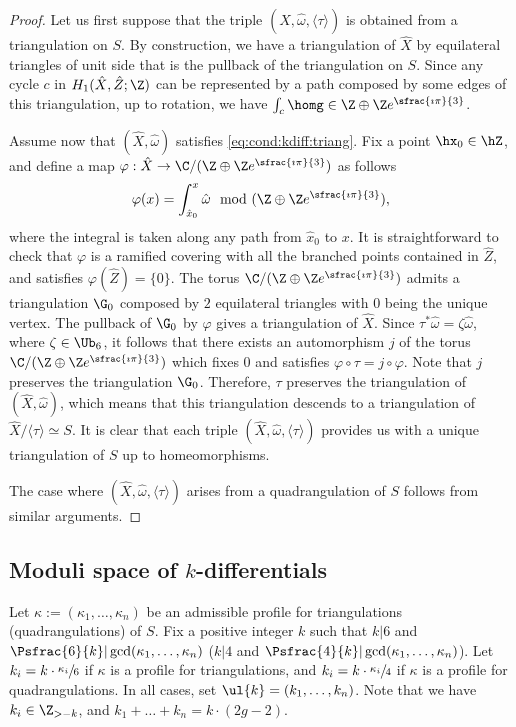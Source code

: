 \begin{proof}
Let us first suppose that the triple $(\hat{X},\hat{\omega},\langle\tau\rangle)$ is obtained from a triangulation on $S$. By construction, we have a triangulation of $\hat{X}$ by equilateral triangles of unit side that is the pullback of the triangulation on $S$. Since any cycle $c$ in $H_1(\hat{X},\hat{Z};\Z)$ can be represented by a path composed by some edges of this triangulation, up to rotation, we have $\int_c\homg \in \Z\oplus\Z e^{\sfrac{\imath\pi}{3}}$.

Assume now that $(\hat{X},\hat{\omega})$ satisfies \eqref{eq:cond:kdiff:triang}. Fix a point $\hx_0 \in \hZ$, and define a map $\varphi: \hat{X} \to \C/(\Z\oplus\Z e^{\sfrac{\imath\pi}{3}})$ as follows
\[
\varphi(x)=\int_{\hat{x}_0}^x \hat{\omega} \mod (\Z\oplus\Z e^{\sfrac{\imath\pi}{3}}),
\]
where the integral is taken along any path from $\hat{x}_0$ to $x$.
It is straightforward to check that $\varphi$ is a ramified covering with all the branched points contained in $\hat{Z}$, and satisfies $\varphi(\hat{Z})=\{0\}$.
The torus $\C/(\Z\oplus\Z e^{\sfrac{\imath\pi}{3}})$ admits a triangulation $\G_0$ composed by $2$ equilateral triangles with $0$ being the unique vertex.
The pullback of $\G_0$ by $\varphi$ gives a triangulation of $\hat{X}$.
Since $\tau^*\hat{\omega}=\zeta\hat{\omega}$, where $\zeta \in \Ub_6$, it follows that there exists an automorphism $j$ of the torus $\C/(\Z\oplus\Z e^{\sfrac{\imath\pi}{3}})$ which fixes $0$ and satisfies $\varphi\circ\tau=j\circ\varphi$. Note that $j$ preserves the triangulation $\G_0$.
Therefore, $\tau$ preserves the triangulation of $(\hat{X},\hat{\omega})$, which means that
this triangulation descends to a triangulation of $\hat{X}/\langle \tau \rangle\simeq S$.
It is clear that each triple $(\hat{X},\hat{\omega},\langle \tau \rangle)$ provides us with a unique triangulation of $S$ up to homeomorphisms.

The case where $(\hat{X},\hat{\omega},\langle \tau \rangle)$ arises from a quadrangulation of $S$ follows from similar arguments.
\end{proof}

\subsection{Moduli space of $k$-differentials}\label{sec:mod:sp:kdiff}
Let $\kappa:=(\kappa_1,\dots,\kappa_n)$ be an admissible profile for triangulations (\resp quadrangulations) of $S$. Fix a positive integer $k$ such that $k|6$ and $\Psfrac{6}{k} | \gcd(\kappa_1,\dots,\kappa_n)$ (\resp $k | 4$ and $\Psfrac{4}{k} | \gcd(\kappa_1,\dots,\kappa_n)$). Let $k_i=k\cdot\sfrac{\kappa_i}{6}$ if $\kappa$ is a profile for triangulations, and $k_i=k\cdot\sfrac{\kappa_i}{4}$ if $\kappa$ is a profile for quadrangulations. In all cases, set $\ul{k}=(k_1,\dots,k_n)$.
Note that we have $k_i\in \Z_{>-k}$, and $k_1+\dots+k_n=k\cdot(2g-2)$.

